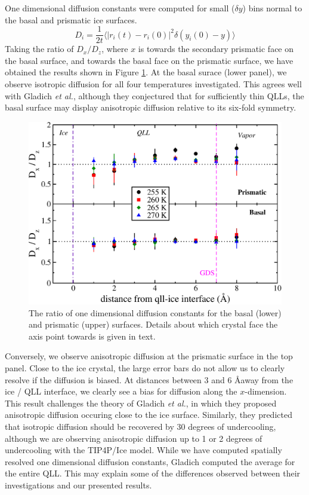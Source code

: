 One dimensional diffusion constants were computed for small
($\delta y$) bins normal to the basal and prismatic ice surfaces.
\begin{equation}\label{eq:1dDiff}
D_i = \frac{1}{2t} \langle | {r}_i(t) - {r}_i(0) |^2
\delta(y_i(0) - y)  \rangle 
\end{equation}
Taking the ratio of $D_x / D_z$, where $x$ is towards the secondary
prismatic face on the basal surface, and towards the basal face on the
prismatic surface, we have obtained the results shown in Figure
\ref{fig:dxdz}. At the basal surace (lower panel), we observe
isotropic diffusion for all four temperatures investigated. This
agrees well with Gladich \textit{et al.},\cite{Gladich2011} although
they conjectured that for sufficiently thin QLLs, the basal surface
may display anisotropic diffusion relative to its six-fold
symmetry. 

\begin{figure}
\includegraphics[width=\linewidth]{Figures/rd}
\caption{\label{fig:dxdz}The ratio of one dimensional diffusion
  constants for the basal (lower) and prismatic (upper)
  surfaces. Details about which crystal face the axis point towards is
  given in text.}
\end{figure} 

Conversely, we observe anisotropic diffusion at the
prismatic surface in the top panel. Close to the ice crystal, the
large error bars do not allow us to clearly resolve if the diffusion
is biased. At distances between 3 and 6 \AA away from the ice / QLL
interface, we clearly see a bias for diffusion along the
$x$-dimension. This result challenges the theory of Gladich \textit{et
  al.}, in which they proposed anisotropic diffusion occuring close to
the ice surface. Similarly, they predicted that isotropic diffusion
should be recovered by 30 degrees of undercooling, although we are
observing anisotropic diffusion up to 1 or 2 degrees of undercooling
with the TIP4P/Ice model. While we have computed spatially resolved
one dimensional diffusion constants, Gladich computed the average for
the entire QLL. This may explain some of the differences observed
between their investigations and our presented results.


